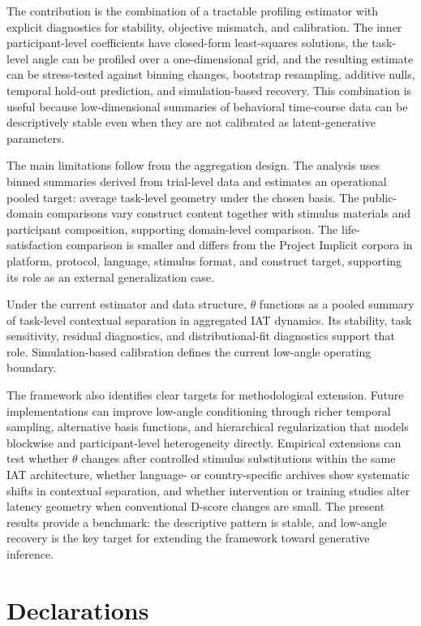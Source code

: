 \documentclass[12pt]{article}
\begin{document}
The contribution is the combination of a tractable profiling estimator with explicit diagnostics for stability, objective mismatch, and calibration. The inner participant-level coefficients have closed-form least-squares solutions, the task-level angle can be profiled over a one-dimensional grid, and the resulting estimate can be stress-tested against binning changes, bootstrap resampling, additive nulls, temporal hold-out prediction, and simulation-based recovery. This combination is useful because low-dimensional summaries of behavioral time-course data can be descriptively stable even when they are not calibrated as latent-generative parameters.

The main limitations follow from the aggregation design. The analysis uses binned summaries derived from trial-level data and estimates an operational pooled target: average task-level geometry under the chosen basis. The public-domain comparisons vary construct content together with stimulus materials and participant composition, supporting domain-level comparison. The life-satisfaction comparison is smaller and differs from the Project Implicit corpora in platform, protocol, language, stimulus format, and construct target, supporting its role as an external generalization case.

Under the current estimator and data structure, \(\theta\) functions as a pooled summary of task-level contextual separation in aggregated IAT dynamics. Its stability, task sensitivity, residual diagnostics, and distributional-fit diagnostics support that role. Simulation-based calibration defines the current low-angle operating boundary.

The framework also identifies clear targets for methodological extension. Future implementations can improve low-angle conditioning through richer temporal sampling, alternative basis functions, and hierarchical regularization that models blockwise and participant-level heterogeneity directly. Empirical extensions can test whether \(\theta\) changes after controlled stimulus substitutions within the same IAT architecture, whether language- or country-specific archives show systematic shifts in contextual separation, and whether intervention or training studies alter latency geometry when conventional D-score changes are small. The present results provide a benchmark: the descriptive pattern is stable, and low-angle recovery is the key target for extending the framework toward generative inference.

\section*{Declarations}
\end{document}
